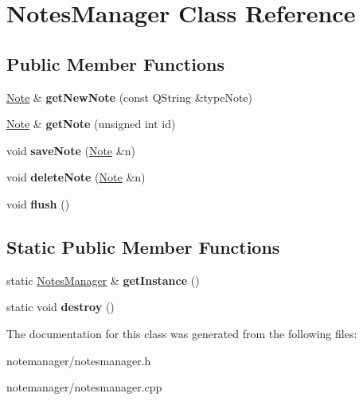 \hypertarget{class_notes_manager}{\section{Notes\-Manager Class Reference}
\label{class_notes_manager}
}
\subsection*{Public Member Functions}
\begin{DoxyCompactItemize}
\item 
\hypertarget{class_notes_manager_a055f7d2a8fbf3fa9cdeaccd30ae2cc46}{\hyperlink{class_note}{Note} \& {\bfseries get\-New\-Note} (const Q\-String \&type\-Note)}\label{class_notes_manager_a055f7d2a8fbf3fa9cdeaccd30ae2cc46}

\item 
\hypertarget{class_notes_manager_a559c0b690aa23fb568b4a8e53a6f51cc}{\hyperlink{class_note}{Note} \& {\bfseries get\-Note} (unsigned int id)}\label{class_notes_manager_a559c0b690aa23fb568b4a8e53a6f51cc}

\item 
\hypertarget{class_notes_manager_a73b0f85ed9efe1a4e674066b25d8eca0}{void {\bfseries save\-Note} (\hyperlink{class_note}{Note} \&n)}\label{class_notes_manager_a73b0f85ed9efe1a4e674066b25d8eca0}

\item 
\hypertarget{class_notes_manager_a29d032aae2c5c2a95bbd11c8345f05e5}{void {\bfseries delete\-Note} (\hyperlink{class_note}{Note} \&n)}\label{class_notes_manager_a29d032aae2c5c2a95bbd11c8345f05e5}

\item 
\hypertarget{class_notes_manager_a855421c29282fcf9be82fbeab49bb288}{void {\bfseries flush} ()}\label{class_notes_manager_a855421c29282fcf9be82fbeab49bb288}

\end{DoxyCompactItemize}
\subsection*{Static Public Member Functions}
\begin{DoxyCompactItemize}
\item 
\hypertarget{class_notes_manager_a7311347da4088a6622955e46d53e7599}{static \hyperlink{class_notes_manager}{Notes\-Manager} \& {\bfseries get\-Instance} ()}\label{class_notes_manager_a7311347da4088a6622955e46d53e7599}

\item 
\hypertarget{class_notes_manager_a0a59c90d258941687c5ea281eb2842b9}{static void {\bfseries destroy} ()}\label{class_notes_manager_a0a59c90d258941687c5ea281eb2842b9}

\end{DoxyCompactItemize}


The documentation for this class was generated from the following files\-:\begin{DoxyCompactItemize}
\item 
notemanager/notesmanager.\-h\item 
notemanager/notesmanager.\-cpp\end{DoxyCompactItemize}
